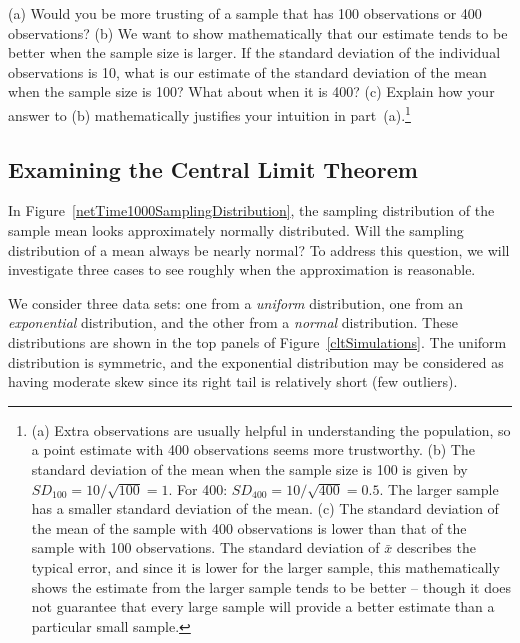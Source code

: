 \begin{exercise}
(a) Would you be more trusting of a sample that has 100 observations or 400 observations? (b) We want to show mathematically that our estimate tends to be better when the sample size is larger. If the standard deviation of the individual observations is 10, what is our estimate of the standard deviation of the mean when the sample size is 100? What about when it is 400? (c) Explain how your answer to (b) mathematically justifies your intuition in part~(a).\footnote{(a) Extra observations are usually helpful in understanding the population, so a point estimate with 400 observations seems more trustworthy. (b) The standard deviation of the mean when the sample size is 100 is given by $SD_{100} = 10/\sqrt{100} = 1$. For 400: $SD_{400} = 10/\sqrt{400} = 0.5$. The larger sample has a smaller standard deviation of the mean. (c) The standard deviation of the mean of the sample with 400 observations is lower than that of the sample with 100 observations. The standard deviation of $\bar{x}$ describes the typical error, and since it is lower for the larger sample, this mathematically shows the estimate from the larger sample tends to be better -- though it does not guarantee that every large sample will provide a better estimate than a particular small sample.}
\end{exercise}


\subsection{Examining the Central Limit Theorem}
\label{cltSection}


In Figure~\ref{netTime1000SamplingDistribution}, the sampling distribution of the sample mean looks approximately normally distributed.  Will the sampling distribution of a mean always be nearly normal? To address this question, we will investigate three cases to see roughly when the approximation is reasonable.

We consider three data sets: one from a \emph{uniform} distribution, one from an \emph{exponential} distribution, and the other from a \emph{normal} distribution. These distributions are shown in the top panels of Figure~\ref{cltSimulations}. The uniform distribution is symmetric, and the exponential distribution may be considered as having moderate skew since its right tail is relatively short (few outliers).

